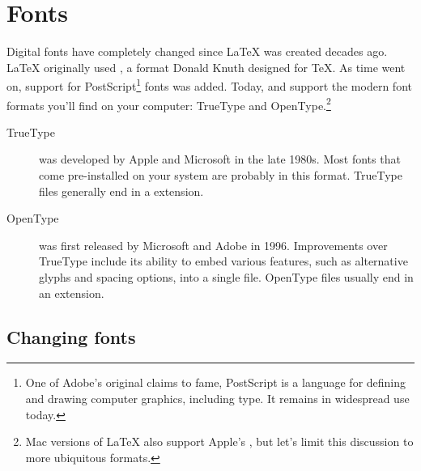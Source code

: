 \chapter{Fonts}
\label{fonts}

Digital fonts have completely changed since \LaTeX{} was created decades ago.
\LaTeX{} originally used \MF,
a format Donald Knuth designed for \TeX{}.
As time went on, support for PostScript\footnote{One of
Adobe's original claims to fame,
PostScript is a language for defining and drawing computer graphics,
including type. It remains in widespread use today.} fonts was added.
Today, \LuaLaTeX{} and \XeLaTeX{} support the modern font formats you'll find
on your computer:
TrueType and OpenType.\punckern\footnote{Mac versions of \LaTeX{} also support
Apple's , but let's limit this discussion to
more ubiquitous formats.}

\begin{description}
\item[TrueType] was developed by Apple and Microsoft in the late 1980s.
    Most fonts that come pre-installed on your system are probably
    in this format.
    TrueType files generally end in a  extension.
\item[OpenType] was first released by Microsoft and Adobe in 1996.
    Improvements over TrueType include its ability to embed
    various features, such as alternative glyphs
    and spacing options, into a single file.
    OpenType files usually end in an  extension.
\end{description}

\section{Changing fonts}


